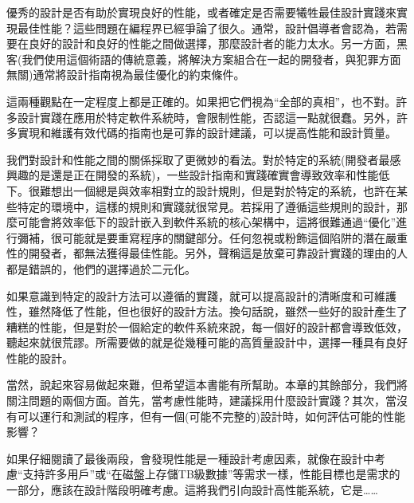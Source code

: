 優秀的設計是否有助於實現良好的性能，或者確定是否需要犧牲最佳設計實踐來實現最佳性能？這些問題在編程界已經爭論了很久。通常，設計倡導者會認為，若需要在良好的設計和良好的性能之間做選擇，那麼設計者的能力太水。另一方面，黑客(我們使用這個術語的傳統意義，將解決方案組合在一起的開發者，與犯罪方面無關)通常將設計指南視為最佳優化的約束條件。 

這兩種觀點在一定程度上都是正確的。如果把它們視為“全部的真相”，也不對。許多設計實踐在應用於特定軟件系統時，會限制性能，否認這一點就很蠢。另外，許多實現和維護有效代碼的指南也是可靠的設計建議，可以提高性能和設計質量。 

我們對設計和性能之間的關係採取了更微妙的看法。對於特定的系統(開發者最感興趣的是還是正在開發的系統)，一些設計指南和實踐確實會導致效率和性能低下。很難想出一個總是與效率相對立的設計規則，但是對於特定的系統，也許在某些特定的環境中，這樣的規則和實踐就很常見。若採用了遵循這些規則的設計，那麼可能會將效率低下的設計嵌入到軟件系統的核心架構中，這將很難通過“優化”進行彌補，很可能就是要重寫程序的關鍵部分。任何忽視或粉飾這個陷阱的潛在嚴重性的開發者，都無法獲得最佳性能。另外，聲稱這是放棄可靠設計實踐的理由的人都是錯誤的，他們的選擇過於二元化。 

如果意識到特定的設計方法可以遵循的實踐，就可以提高設計的清晰度和可維護性，雖然降低了性能，但也很好的設計方法。換句話說，雖然一些好的設計產生了糟糕的性能，但是對於一個給定的軟件系統來說，每一個好的設計都會導致低效，聽起來就很荒謬。所需要做的就是從幾種可能的高質量設計中，選擇一種具有良好性能的設計。 

當然，說起來容易做起來難，但希望這本書能有所幫助。本章的其餘部分，我們將關注問題的兩個方面。首先，當考慮性能時，建議採用什麼設計實踐？其次，當沒有可以運行和測試的程序，但有一個(可能不完整的)設計時，如何評估可能的性能影響？

如果仔細閱讀了最後兩段，會發現性能是一種設計考慮因素，就像在設計中考慮“支持許多用戶”或“在磁盤上存儲TB級數據”等需求一樣，性能目標也是需求的一部分，應該在設計階段明確考慮。這將我們引向設計高性能系統，它是……


































































